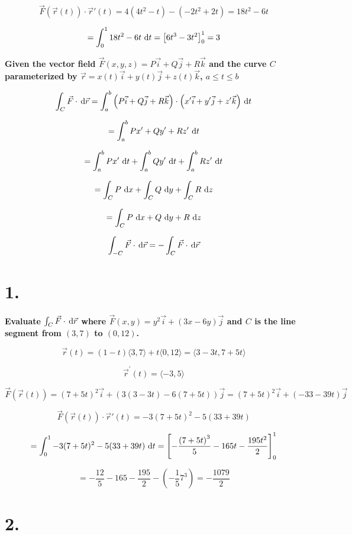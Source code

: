 \documentclass{scrartcl}
\DeclareRobustCommand*\d
{\ifmmode\mathop{}\!\mathrm{d}\else\expandafter\originald\fi}
\begin{document}
\[\vec{F}(\vec{r}(t))\cdot \vec{r}{\prime}(t) =4(4t^2-t)-(-2t^2+2t) = 18t^2 -6t\]

\[=\int_{0}^{1} 18t^2-6t\, \d t =\left[6t^3-3t^2\right]_{0}^{1}=3\]

\textbf{Given the vector field $\vec{F}(x,y,z)= P\vec{i}+Q\vec{j}+R\vec{k}$ and the curve $C$ parameterized by $\vec{r}=x(t)\vec{i}+y(t)\vec{j}+z(t)\vec{k}$, $a\leq t \leq b$}

\[\int_{C}^{} \vec{F} \cdot \, \d \vec{r} = \int_{a}^{b} \left(P\vec{i}+Q\vec{j}+R\vec{k}\right) \cdot \left(x^{\prime}\vec{i}+y^{\prime}\vec{j}+z^{\prime}\vec{k}\right) \, \d t\]

\[= \int_{a}^{b} Px^{\prime}+Qy^{\prime}+Rz^{\prime}  \, \d t\]

\[= \int_{a}^{b} Px^{\prime} \, \d t +\int_{a}^{b} Qy^{\prime} \, \d t+ \int_{a}^{b} Rz^{\prime}  \, \d t\]

\[= \int_{C}^{} P \, \d x +\int_{C}^{} Q\, \d y + \int_{C}^{} R \, \d z\]

\[= \int_{C}^{} P \, \d x +  Q\, \d y + R \, \d z\]

\[\int_{-C}^{} \vec{F} \cdot \, \d \vec{r} = - \int_{C}^{} \vec{F} \cdot \, \d \vec{r}\]


\section*{1.}

\textbf{Evaluate $\int_{C}^{} \vec{F} \cdot \, \d \vec{r}$ where $\vec{F}(x,y)=y^2\vec{i}+(3x-6y)\vec{j}$ and $C$ is the line segment from $(3,7)$ to $(0,12)$.}

\[\vec{r}(t)=(1-t)\langle 3,7\rangle +t\langle 0,12\rangle=\langle 3-3t,7+5t\rangle\]

\[\vec{r}^{\prime}(t)=\langle -3,5 \rangle\]

\[\vec{F}(\vec{r}(t))= (7+5t)^2\vec{i}+(3(3-3t)-6(7+5t))\vec{j}=(7+5t)^2\vec{i}+(-33-39t)\vec{j}\]

\[\vec{F}(\vec{r}(t))\cdot \vec{r}{\prime}(t) =-3(7+5t)^2 - 5(33+39t)\]

\[=\int_{0}^{1} -3(7+5t)^2 - 5(33+39t) \, \d t =\left[- \frac{\left(7+5t\right)^3}{5}-165t-\frac{195t^2}{2}\right]_{0}^{1}\]

\[= -\frac{12}{5} - 165 -\frac{195}{2} - \left(-\frac{1}{5}7^3\right) =-\frac{1079}{2} \]

\section*{2.}
\end{document}
